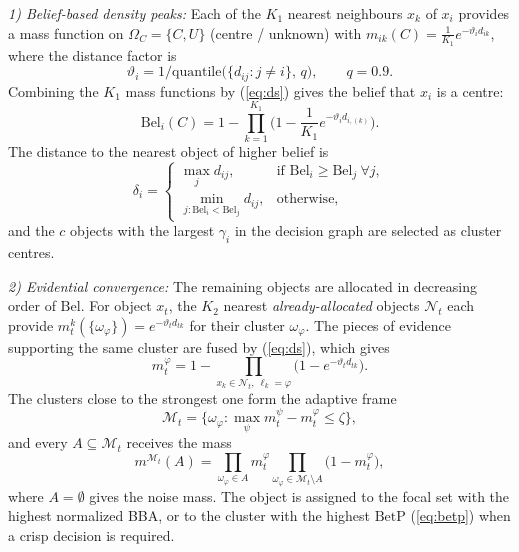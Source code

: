 \documentclass[journal]{IEEEtran}
\newcommand{\Bel}{\mathrm{Bel}}
\newcommand{\BetP}{\mathrm{BetP}}
\begin{document}
\emph{1) Belief-based density peaks:} Each of the $K_1$ nearest neighbours $x_k$ of $x_i$ provides a mass function on $\Omega_C=\{C,U\}$ (centre / unknown) with $m_{ik}(C)=\tfrac{1}{K_1}e^{-\vartheta_i d_{ik}}$, where the distance factor is
\begin{equation}
\vartheta_i = 1/\mathrm{quantile}\big(\{d_{ij}: j\neq i\},\,q\big),\qquad q=0.9. \label{eq:theta}
\end{equation}
Combining the $K_1$ mass functions by (\ref{eq:ds}) gives the belief that $x_i$ is a centre:
\begin{equation}
\Bel_i(C)=1-\prod_{k=1}^{K_1}\Big(1-\frac{1}{K_1}e^{-\vartheta_i d_{i,(k)}}\Big). \label{eq:bel}
\end{equation}
The distance to the nearest object of higher belief is
\begin{equation}
\delta_i=\begin{cases}\max_j d_{ij}, & \text{if } \Bel_i\ge\Bel_j\ \forall j,\\ \min_{j:\Bel_i<\Bel_j} d_{ij}, & \text{otherwise,}\end{cases} \label{eq:delta}
\end{equation}
and the $c$ objects with the largest $\gamma_i$ in the decision graph are selected as cluster centres.

\emph{2) Evidential convergence:} The remaining objects are allocated in decreasing order of $\Bel$. For object $x_t$, the $K_2$ nearest \emph{already-allocated} objects $\mathcal{N}_t$ each provide $m^k_t(\{\omega_\varphi\})=e^{-\vartheta_t d_{tk}}$ for their cluster $\omega_\varphi$. The pieces of evidence supporting the same cluster are fused by (\ref{eq:ds}), which gives
\begin{equation}
m^{\varphi}_t=1-\prod_{x_k\in\mathcal{N}_t,\ \ell_k=\varphi}\big(1-e^{-\vartheta_t d_{tk}}\big). \label{eq:support}
\end{equation}
The clusters close to the strongest one form the adaptive frame
\begin{equation}
\mathcal{M}_t=\{\omega_\varphi : \max_{\psi} m^{\psi}_t - m^{\varphi}_t\le\zeta\}, \label{eq:mt}
\end{equation}
and every $A\subseteq\mathcal{M}_t$ receives the mass
\begin{equation}
m^{\mathcal{M}_t}(A)=\prod_{\omega_\varphi\in A} m^{\varphi}_t\prod_{\omega_\varphi\in\mathcal{M}_t\setminus A}\big(1-m^{\varphi}_t\big), \label{eq:bba}
\end{equation}
where $A=\emptyset$ gives the noise mass. The object is assigned to the focal set with the highest normalized BBA, or to the cluster with the highest $\BetP$ (\ref{eq:betp}) when a crisp decision is required.
\end{document}
